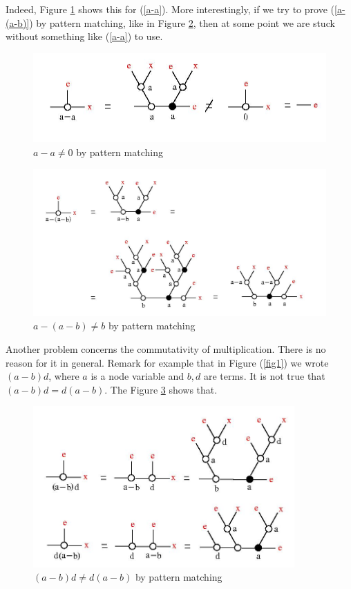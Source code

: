 \documentclass{article}
\begin{document}
Indeed, Figure \ref{a-a-fig} shows this for (\ref{a-a}).  More interestingly, if we try to prove (\ref{a-(a-b)}) by pattern matching, like in Figure \ref{a-(a-b)-fig}, then at some point we are stuck without something like (\ref{a-a}) to use. 

\begin{figure}[h]\centerline{\includegraphics[width=120mm]{jpg/a-a.jpg}}  \caption{ $a-a \not = 0$ by pattern matching } \label{a-a-fig}  
\end{figure}

\begin{figure}[h]\includegraphics[width=120mm]{jpg/a-a-b.jpg}  \caption{ $a-(a-b) \not = b$ by pattern matching } \label{a-(a-b)-fig} \end{figure}




Another problem concerns the commutativity of multiplication. There is no reason for it in general. Remark for example that in Figure (\ref{fig1}) we wrote $(a-b)d$, where $a$ is a node variable and $b, d$ are terms. It is not true that $(a-b)d = d(a-b)$. The Figure \ref{a-bd-fig} shows that. 
\begin{figure}[h]\centerline{\includegraphics[width=100mm]{jpg/a-bd.jpg}}
\caption{ $(a-b)d \not = d(a-b)$ by pattern matching} \label{a-bd-fig} 
\end{figure}
\end{document}
